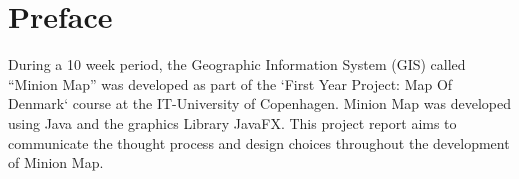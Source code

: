 \section{Preface}
During a 10 week period, the Geographic Information System (GIS) called “Minion Map” was developed as part of the `First Year Project: Map Of Denmark` course at the IT-University of Copenhagen. Minion Map was developed using Java and the graphics Library JavaFX.
This project report aims to communicate the thought process and design choices throughout the development of Minion Map. 
